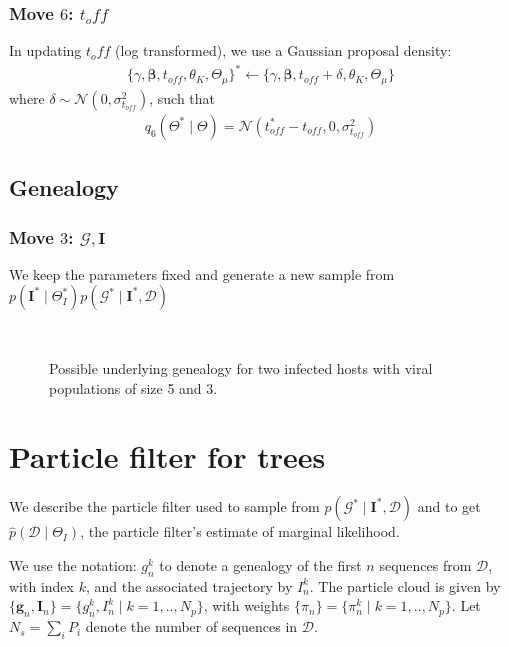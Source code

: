 \documentclass[a4paper,18pt]{report}
\begin{document}
\subsubsection{Move $6$: $t_off$}
In updating $t_off$ (log transformed), we use a Gaussian proposal density:
\begin{eqnarray}
 \{\gamma, \boldsymbol{\beta}, t_{off}, \theta_K, \Theta_{\mu}\}^*\leftarrow \{\gamma , \boldsymbol{\beta}, t_{off}+ \delta, \theta_K,  \Theta_{\mu}\}
\end{eqnarray}
where $\delta\sim\mathcal{N}(0,\sigma_{t_{off}}^2)$, such that 
\begin{eqnarray}
q_6(\Theta^*\mid\Theta) = \mathcal{N}(t_{off}^*-t_{off},0,\sigma_{t_{off}}^2)
\end{eqnarray}
\subsection{Genealogy}
\subsubsection{Move $3$: $\mathcal{G}, \mathbf{I}$}
We keep the parameters fixed and generate a new sample from $p(\mathbf{I}^* \mid \Theta_I^*)p(\mathcal{G}^* \mid \mathbf{I}^*, \mathcal{D})$

\begin{figure}[h]
\centering
{}\\
\caption{Possible underlying genealogy for two infected hosts with viral populations of size 5 and 3.}
\end{figure}

\section{Particle filter for trees}
We describe the particle filter used to sample from $p(\mathcal{G}^* \mid \mathbf{I}^*, \mathcal{D})$ and to get $\hat{p}(\mathcal{D} \mid \Theta_I)$, the particle filter's estimate of marginal likelihood. 

We use the notation: $g_n^k$ to denote a genealogy of the first $n$ sequences from $\mathcal{D}$, with index $k$, and the associated trajectory by $I_n^k$. The particle cloud is
given by $\{\mathbf{g}_n, \mathbf{I}_n\}=\{g_n^k,  I_n^k \mid k=1,..,N_p\}$, with weights $\{\pi_n\}=\{\pi_n^k \mid k=1,..,N_p\}$. Let $N_s = \sum_i P_i$ denote the number of sequences in $\mathcal{D}$. 
\end{document}
